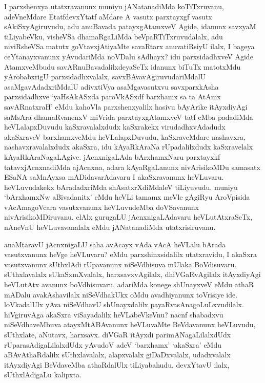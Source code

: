 
\begin{artha}
I parxshenxya utatxravanunx muniyu jANatanadiMda koTiTxruvanu, adeVneMdare EtatfdevxYtatf aMdare A vasutx parxtayxgf vasutx sAkiSxyAgiruvudu, adu anuBavada patayxgAtamxveV Agide, idanunx savxyaM tiLiyabeVku, visheVSa dhamaRgaLiMda beVpaRTiTxruvudalalx, adu niviRsheVSa matutx goVtavxjAtiyaMte savaRtarx anuvatiRsiyU ilalx, I bageya ceYtanayxvanunx yAvudariMda noVDalu sAdhayx? idu parxsidadhxveV Agide AtamxveMbudu savARnuBavadalilxdeyaSeTx idanunx biTuTx matotxMdu yArobabxrigU parxsidadhxvalalx, savxBAvavAgiruvudariMdalU asaMgavAdadxriMdalU adivxtiVya asaMgavasutxvu savxparxkAsha parxsidadhxve `yaHsAkASxda paroVkASxdf barxhamx sa ta AtAmx savARnatxraH' eMdu kahoVla parxshenxyalilx hasivu bAyArike itAyxdiyAgi saMsAra dhamaRvanenxV miVrida parxtayxgAtamxveV tatf eMba padadiMda heVLalapxDuvudu kaSxravalalxdudx kaSxrakekx virudadhxvAdadudx akaSxraveV barxhamxveMdu heVLalapxDuvudu, kaSxraveMdare nashavxra, nashavxravalalxdudx akaSxra, idu kAyaRkAraNa rUpadalilxdudx kaSxravelalx kAyaRkAraNagaLAgive. jAcnxnigaLAda bArxhamxNaru parxtayxkf tatavxjAcnxnadiMda ajAcnxna, adara kAyaRgaLanunx nivArisikoMDu samasatx ESaNA saMnAyxsa mADidavarAdavaru I akaSxravanunx heVLuvaru. heVLuvudakekx bAradadxriMda shAsatxrXdiMdaleV tiLiyuvudu. muniyu `bArxhamxNw aBivadanitx' eMdu heVLi tamamx meVle gAgiRyu AroVpisida vAcAmagoVcara vasutxvanunx heVLuvudeMba doVSavanunx nivArisikoMDiruvanu. elAlx gurugaLU jAcnxnigaLAdavaru heVLutAtxraSeTx, nAneVnU heVLuvavanalalx eMdu jANatanadiMda utatxrisiruvanu.
\end{artha}%


\begin{artha}
anaMtaravU jAcnxnigaLU saha avAcayx vAda vAcA heVLalu bArada vasutxvanunx heVge heVLuvaru? eMdu parxshinxsidalilx utatxravidu, I akaSxra vasutxvanunx sUthxlAdi rUpavanunx niSeVdhisuva mUlaka BoVdisuvaru. sUthxlavalalx sUkaSxmXvalalx, harxsavxvAgilalx, dhiVGaRvAgilalx itAyxdiyAgi heVLutAtx avanunx boVdhisuvaru, adariMda konege shUnayxveV eMdu athaR mADalu avakAshavilalx niSeVdhakUkx oMdu avadhiyanunx toVrisiye ide. loVkadalUlx yAva niSeVdhavU shUnayxdalilx payaRvasAnagoLuLxvudilalx. hiVgiruvAga akaSxra viSayadalilx heVLabeVkeVnu? nacnf shabadxvu niSeVdhaveMbuva atayxMtABAvanunx heVLuvaMte BeVdavanunx heVLuvudu, sUthxlate, aNutavx, harxsavx. diVGaR itAyxdi parimANagaLilalxdUdx rUparasAdigaLilalxdUdx yAvudoV adeV `barxhamx' `akaSxra' eMdu aBAvAthaRdalilx sUthxlavalalx, alapxvalalx giDaDxvalalx, udadxvalalx itAyxdiyAgi BeVdaveMba athaRdalUlx tiLiyabahudu. devxYtavU ilalx, sUthxlAdigaLu kalipxta.
\end{artha}%

